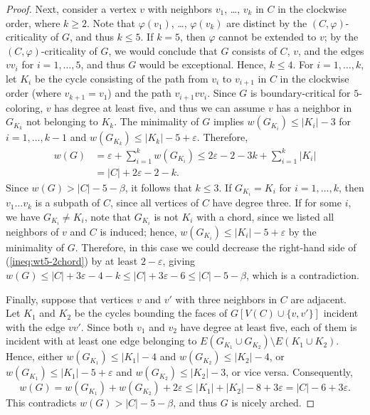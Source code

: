 \documentclass[12pt,twoside,openright,a4paper]{book}
\begin{document}
\begin{proof}
Next, consider a vertex $v$ with neighbors $v_1$, \ldots, $v_k$ in $C$ in the clockwise order, where $k\ge 2$.
Note that $\varphi(v_1)$, \ldots, $\varphi(v_k)$ are distinct by the $(C,\varphi)$-criticality of $G$,
and thus $k\le 5$.  If $k=5$, then $\varphi$ cannot be extended to $v$; by the $(C,\varphi)$-criticality of $G$,
we would conclude that $G$ consists of $C$, $v$, and the edges $vv_i$ for $i=1,\ldots,5$, and thus $G$ would
be exceptional.  Hence, $k\le 4$.  For $i=1,\ldots,k$, let $K_i$ be the cycle consisting of the path from $v_i$ to
$v_{i+1}$ in $C$ in the clockwise order (where $v_{k+1}=v_1$) and the path $v_{i+1}vv_i$.  Since $G$ is boundary-critical
for $5$-coloring, $v$ has degree at least five, and thus we can assume $v$ has a neighbor in $G_{K_k}$ not belonging to $K_k$.
The minimality of $G$ implies $w(G_{K_i})\le |K_i|-3$ for $i=1,\ldots, k-1$ and $w(G_{K_k})\le |K_k|-5+\varepsilon$.
Therefore,
\begin{align}
w(G)&=\varepsilon+\sum_{i=1}^k w(G_{K_i})\le 2\varepsilon-2-3k+\sum_{i=1}^k |K_i|\nonumber\\
&=|C|+2\varepsilon-2-k.\label{ineq:wt5-2chord}
\end{align}
Since $w(G)>|C|-5-\beta$, it follows that $k\le 3$.
If $G_{K_i}=K_i$ for $i=1,\ldots,k$, then $v_1\ldots v_k$ is a subpath of $C$, since all vertices of $C$ have degree three.
If for some $i$, we have $G_{K_i}\neq K_i$, note that $G_{K_i}$ is not $K_i$ with a chord, since we listed all neighbors of $v$
and $C$ is induced; hence, $w(G_{K_i})\le |K_i|-5+\varepsilon$ by the minimality of $G$.
Therefore, in this case we could decrease the right-hand side of (\ref{ineq:wt5-2chord}) by at least $2-\varepsilon$,
giving $w(G)\le |C|+3\varepsilon-4-k\le |C|+3\varepsilon-6\le |C|-5-\beta$, which is a contradiction.

Finally, suppose that vertices $v$ and $v'$ with three neighbors in $C$ are adjacent.  Let $K_1$ and $K_2$ be the cycles
bounding the faces of $G[V(C)\cup\{v,v'\}]$ incident with the edge $vv'$.  Since both $v_1$ and $v_2$ have degree
at least five, each of them is incident with at least one edge belonging to $E(G_{K_1}\cup G_{K_2})\setminus E(K_1\cup K_2)$.
Hence, either $w(G_{K_1})\le |K_1|-4$ and $w(G_{K_2})\le |K_2|-4$, or $w(G_{K_1})\le |K_1|-5+\varepsilon$ and $w(G_{K_2})\le |K_2|-3$,
or vice versa.  Consequently,
$$w(G)=w(G_{K_1})+w(G_{K_2})+2\varepsilon\le |K_1|+|K_2|-8+3\varepsilon=|C|-6+3\varepsilon.$$
This contradicts $w(G)>|C|-5-\beta$, and thus $G$ is nicely arched.
\end{proof}
\end{document}
